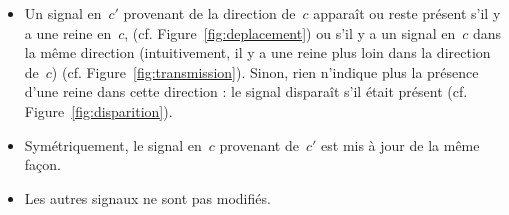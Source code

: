  \begin{itemize} 

\item{%
Un signal en~$c'$ provenant de la direction de~$c$ apparaît ou reste présent s'il y a une reine en~$c$, (cf. Figure~\ref{fig:deplacement}) ou s'il y a un signal en~$c$ dans la même direction (intuitivement, il y a une reine plus loin dans la direction de~$c$) (cf. Figure~\ref{fig:transmission}). Sinon, rien n'indique plus la présence d'une reine dans cette direction : le signal disparaît s'il était présent (cf. Figure~\ref{fig:disparition}). }

\item{ Symétriquement, le signal en~$c$ provenant de~$c'$ est mis à jour de la même façon.}

\item{ Les autres signaux ne sont pas modifiés. }
  


\end{itemize}

